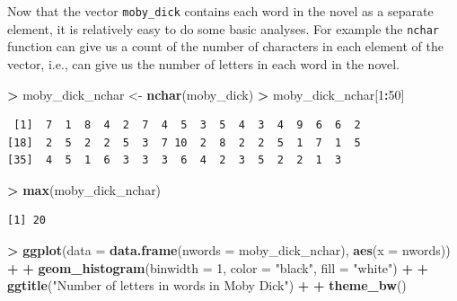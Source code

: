 \documentclass[]{krantz}
\makeatletter
\newenvironment{Shaded}{\begin{snugshade}}{\end{snugshade}}
\newcommand{\KeywordTok}[1]{\textcolor[rgb]{0.27,0.27,0.27}{\textbf{#1}}}
\newcommand{\DataTypeTok}[1]{\textcolor[rgb]{0.27,0.27,0.27}{#1}}
\newcommand{\DecValTok}[1]{\textcolor[rgb]{0.06,0.06,0.06}{#1}}
\newcommand{\StringTok}[1]{\textcolor[rgb]{0.5,0.5,0.5}{#1}}
\newcommand{\OperatorTok}[1]{\textcolor[rgb]{0.43,0.43,0.43}{\textbf{#1}}}
\newcommand{\NormalTok}[1]{#1}
\newenvironment{kframe}{%
\medskip{}
\setlength{\fboxsep}{.8em}
 \def\at@end@of@kframe{}%
 \ifinner\ifhmode%
  \def\at@end@of@kframe{\end{minipage}}%
  \begin{minipage}{\columnwidth}%
 \fi\fi%
 \def\FrameCommand##1{\hskip\@totalleftmargin \hskip-\fboxsep
 \colorbox{shadecolor}{##1}\hskip-\fboxsep
     \hskip-\linewidth \hskip-\@totalleftmargin \hskip\columnwidth}%
 \MakeFramed {\advance\hsize-\width
   \@totalleftmargin\z@ \linewidth\hsize
   \@setminipage}}%
 {\par\unskip\endMakeFramed%
 \at@end@of@kframe}
\renewenvironment{Shaded}{\begin{kframe}}{\end{kframe}}
\makeatother
\begin{document}
Now that the vector \texttt{moby\_dick} contains each word in the novel
as a separate element, it is relatively easy to do some basic analyses.
For example the \texttt{nchar} function can give us a count of the
number of characters in each element of the vector, i.e., can give us
the number of letters in each word in the novel.

\begin{Shaded}
\begin{Highlighting}[]
\OperatorTok{>}\StringTok{ }\NormalTok{moby_dick_nchar <-}\StringTok{ }\KeywordTok{nchar}\NormalTok{(moby_dick)}
\OperatorTok{>}\StringTok{ }\NormalTok{moby_dick_nchar[}\DecValTok{1}\OperatorTok{:}\DecValTok{50}\NormalTok{]}
\end{Highlighting}
\end{Shaded}

\begin{verbatim}
 [1]  7  1  8  4  2  7  4  5  3  5  4  3  4  9  6  6  2
[18]  2  5  2  2  5  3  7 10  2  8  2  2  5  1  7  1  5
[35]  4  5  1  6  3  3  3  6  4  2  3  5  2  2  1  3
\end{verbatim}

\begin{Shaded}
\begin{Highlighting}[]
\OperatorTok{>}\StringTok{ }\KeywordTok{max}\NormalTok{(moby_dick_nchar)}
\end{Highlighting}
\end{Shaded}

\begin{verbatim}
[1] 20
\end{verbatim}

\begin{Shaded}
\begin{Highlighting}[]
\OperatorTok{>}\StringTok{ }\KeywordTok{ggplot}\NormalTok{(}\DataTypeTok{data =} \KeywordTok{data.frame}\NormalTok{(}\DataTypeTok{nwords =}\NormalTok{ moby_dick_nchar), }\KeywordTok{aes}\NormalTok{(}\DataTypeTok{x =}\NormalTok{ nwords)) }\OperatorTok{+}\StringTok{ }
\OperatorTok{+}\StringTok{   }\KeywordTok{geom_histogram}\NormalTok{(}\DataTypeTok{binwidth =} \DecValTok{1}\NormalTok{, }\DataTypeTok{color =} \StringTok{"black"}\NormalTok{, }\DataTypeTok{fill =} \StringTok{"white"}\NormalTok{) }\OperatorTok{+}\StringTok{ }
\OperatorTok{+}\StringTok{   }\KeywordTok{ggtitle}\NormalTok{(}\StringTok{"Number of letters in words in Moby Dick"}\NormalTok{) }\OperatorTok{+}\StringTok{ }
\OperatorTok{+}\StringTok{   }\KeywordTok{theme_bw}\NormalTok{()}
\end{Highlighting}
\end{Shaded}
\end{document}
